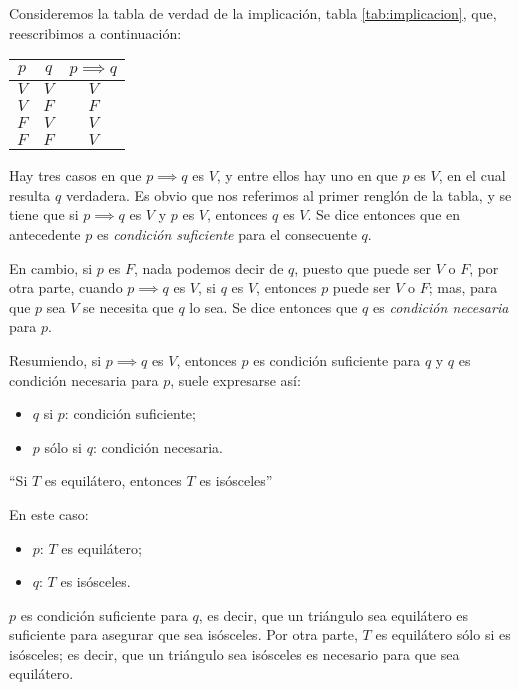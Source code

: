 Consideremos la tabla de verdad de la implicación, tabla \ref{tab:implicacion}, que, reescribimos a continuación:

\begin{table}[H]
	\centering
	\begin{tabular}{|c|c|c|} \hline
		$p$ & $q$ & $p \implies q$ \\ \hline
		$V$ & $V$ & $V$ \\
		$V$ & $F$ & $F$ \\
		$F$ & $V$ & $V$ \\
		$F$ & $F$ & $V$ \\ \hline
	\end{tabular}
\end{table}

Hay tres casos en que $p \implies q$ es $V$, y entre ellos hay uno en que $p$ es $V$, en el cual resulta $q$ verdadera. Es obvio que nos referimos al primer renglón de la tabla, y se tiene que si $p \implies q$ es $V$ y $p$ es $V$, entonces $q$ es $V$. Se dice entonces que en antecedente $p$ es \textit{condición suficiente} para el consecuente $q$.

En cambio, si $p$ es $F$, nada podemos decir de $q$, puesto que puede ser $V$ o $F$, por otra parte, cuando $p \implies q$ es $V$, si $q$ es $V$, entonces $p$ puede ser $V$ o $F$; mas, para que $p$ sea $V$ se necesita que $q$ lo sea. Se dice entonces que $q$ es \textit{condición necesaria} para $p$.

Resumiendo, si $p \implies q$ es $V$, entonces $p$ es condición suficiente para $q$ y $q$ es condición necesaria para $p$, suele expresarse así:

\begin{itemize}
	\item $q$ si $p$: condición suficiente;
	\item $p$ sólo si $q$: condición necesaria.
\end{itemize}

\begin{fmd-example}
	``Si $T$ es equilátero, entonces $T$ es isósceles''
	
	En este caso:
	\begin{itemize}
		\item $p$: $T$ es equilátero;
		\item $q$: $T$ es isósceles.
	\end{itemize}
	
	$p$ es condición suficiente para $q$, es decir, que un triángulo sea equilátero es suficiente para asegurar que sea isósceles. Por otra parte, $T$ es equilátero sólo si es isósceles; es decir, que un triángulo sea isósceles es necesario para que sea equilátero.
\end{fmd-example}

